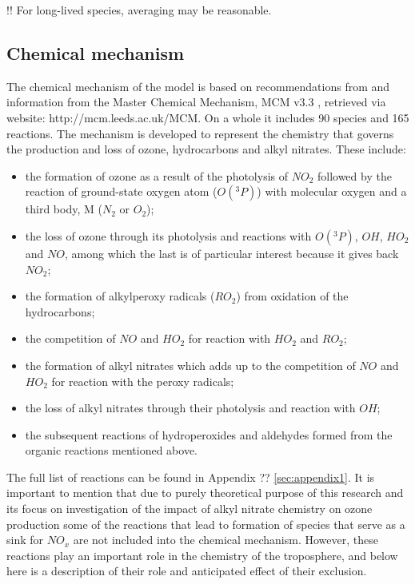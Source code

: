\documentclass[11pt,a4paper]{article}
\begin{document}
!! For long-lived species, averaging may be reasonable.

\subsection{Chemical mechanism}
The chemical mechanism of the model is based on recommendations from \citep{Atkinson2004} and information from the Master Chemical Mechanism, MCM v3.3 \citep{Jenkin1997,Saunders2003}, retrieved via website: http://mcm.leeds.ac.uk/MCM. On a whole it includes 90 species and 165 reactions. The mechanism is developed to represent the chemistry that governs the production and loss of ozone, hydrocarbons and alkyl nitrates. These include:
\begin{itemize}
\item the formation of ozone as a result of the photolysis of $NO_2$ followed by the reaction of ground-state oxygen atom ($O(^3P)$) with molecular oxygen and a third body, M ($N_2$ or $O_2$);
\item the loss of ozone through its photolysis and reactions with $O(^3P)$, $OH$, $HO_2$ and $NO$, among which the last is of particular interest because it gives back $NO_2$;
\item the formation of alkylperoxy radicals ($RO_2$) from oxidation of the hydrocarbons;
\item the competition of $NO$ and $HO_2$ for reaction with $HO_2$ and $RO_2$;
\item the formation of alkyl nitrates which adds up to the competition of $NO$ and $HO_2$ for reaction with the peroxy radicals;
\item the loss of alkyl nitrates through their photolysis and reaction with $OH$;
\item the subsequent reactions of hydroperoxides and aldehydes formed from the organic reactions mentioned above.
\end{itemize}
The full list of reactions can be found in Appendix ?? \ref{sec:appendix1}. It is important to mention that due to purely theoretical purpose of this research and its focus on investigation of the impact of alkyl nitrate chemistry on ozone production some of the reactions that lead to formation of species that serve as a sink for $NO_x$ are not included into the chemical mechanism. However, these reactions play an important role in the chemistry of the troposphere, and below here is a description of their role and anticipated effect of their exclusion.
\end{document}
